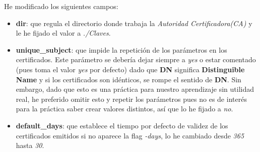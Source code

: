 \documentclass[a4paper, 11pt]{article}
\begin{document}
			He modificado los siguientes campos:
			\begin{itemize}
				\item \textbf{dir}: que regula el directorio donde trabaja la \textit{Autoridad Certificadora(CA)} y le he fijado
				el valor a \textit{./Claves}.
				
				\item \textbf{unique\_subject}: que impide la repetición de los parámetros en los certificados. Este parámetro se
				debería dejar siempre a \textit{yes} o estar comentado (pues toma el valor \textit{yes} por defecto) dado que
				\textbf{DN} significa \textbf{Distinguible Name} y si los certificados son idénticos, se rompe el sentido de
				\textbf{DN}. Sin embargo, dado que esto es una práctica para nuestro aprendizaje sin utilidad real, he preferido
				omitir esto y repetir los parámetros pues no es de interés para la práctica saber crear valores distintos, así que
				lo he fijado a \textit{no}.
				
				\item  \textbf{default\_days}: que establece el tiempo por defecto de validez de los certificados emitidos si no
				aparece la flag \textit{-days}, lo he cambiado desde \textit{365} hasta \textit{30}.
			\end{itemize}
			
\end{document}
